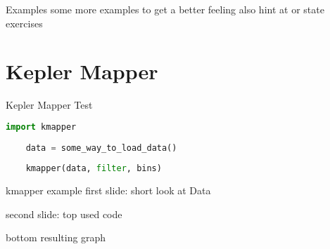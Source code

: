 \documentclass{beamer}
\begin{document}
\begin{frame}{Examples}
some more examples to get a better feeling
also hint at or state exercises
\end{frame}


\section{Kepler Mapper}

\begin{frame}[fragile]{Kepler Mapper}
Test
\begin{lstlisting}[backgroundcolor = \color{bg!90!fg},
                   language = python,
                   xleftmargin = 1cm,
									]
	import kmapper
	
	data = some_way_to_load_data()
	
	kmapper(data, filter, bins)
\end{lstlisting}
\end{frame}


\begin{frame}{kmapper example}
first slide:
short look at Data

second slide:
top	used code

bottom resulting graph
\end{frame}
\end{document}
